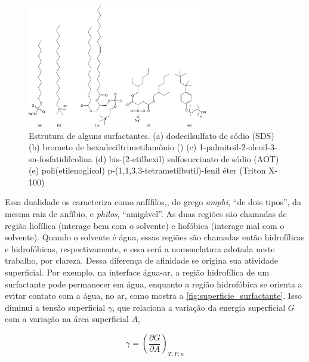 	\begin{figure}[h] 
		\centering
		\includegraphics[width=0.7\textwidth]{./imagens/introducao/estrutura_surfactantes}
		\caption{Estrutura de alguns surfactantes. (a) dodecilsulfato de sódio (SDS) (b) brometo de hexadeciltrimetilamônio (\CTAB) (c) 1-palmitoil-2-oleoil-3-sn-fosfatidilcolina (d) bis-(2-etilhexil) sulfosuccinato de sódio (AOT) (e) poli(etilenoglicol) p-(1,1,3,3-tetrametilbutil)-fenil éter (Triton X-100)}
		\label{fig:estrutura_surfactantes}
	\end{figure} 
	
	Essa dualidade os caracteriza como anfífilos,\cite{ColloidalDomain}, do grego \emph{amphi}, ``de dois tipos'', da mesma raiz de anfíbio, e \emph{philos}, ``amigável''. As duas regiões são chamadas de região liofílica (interage bem com o solvente) e liofóbica (interage mal com o solvente). Quando o solvente é água, essas regiões são chamadas então hidrofílicas e hidrofóbicas, respectivamente, e essa será a nomenclatura adotada neste trabalho, por clareza. Dessa diferença de afinidade se origina sua atividade superficial. Por exemplo, na interface água-ar, a região hidrofílica de um surfactante pode permanecer em água, enquanto a região hidrofóbica se orienta a evitar contato com a água, no ar, como mostra a \autoref{fig:superficie_surfactante}. Isso diminui a tensão superficial \(\gamma\), que relaciona a variação da energia superficial \(G\) com a variação na área superficial \(A\),
	
	\begin{equation}
		\gamma = \left( \dfrac{\partial G}{\partial A}  \right)_{T,P,n}
		\label{eqn:tens_superficial}
	\end{equation}
	
